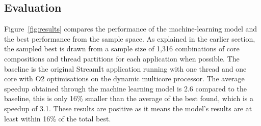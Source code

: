 \subsection{Evaluation}

Figure~\ref{fig:results} compares the performance of the machine-learning model and the best performance from the sample space.
As explained in the earlier section, the sampled best is drawn from a sample size of 1,316 combinations of core compositions and thread partitions for each application when possible.
The baseline is the original StreamIt application running with one thread and one core with O2 optimisations on the dynamic multicore processor.
The average speedup obtained through the machine learning model is 2.6 compared to the baseline, this is only 16\% smaller than the average of the best found, which is a speedup of 3.1.
These results are positive as it means the model's results are at least within 16\% of the total best.

